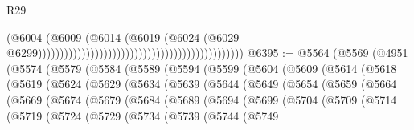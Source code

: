 \begin{lexlean}{R29}
\begin{coremodule}
                                                                                      (@6004
                                                                                        (@6009
                                                                                          (@6014
                                                                                            (@6019
                                                                                              (@6024
                                                                                                (@6029
                                                                                                  @6299)))))))))))))))))))))))))))))))))))))))))))))))
@6395 := @5564
    (@5569
      (@4951
        (@5574
          (@5579
            (@5584
              (@5589
                (@5594
                  (@5599
                    (@5604
                      (@5609
                        (@5614
                          (@5618
                            (@5619
                              (@5624
                                (@5629
                                  (@5634
                                    (@5639
                                      (@5644
                                        (@5649
                                          (@5654
                                            (@5659
                                              (@5664
                                                (@5669
                                                  (@5674
                                                    (@5679
                                                      (@5684
                                                        (@5689
                                                          (@5694
                                                            (@5699
                                                              (@5704
                                                                (@5709
                                                                  (@5714
                                                                    (@5719
                                                                      (@5724
                                                                        (@5729
                                                                          (@5734
                                                                            (@5739
                                                                              (@5744
                                                                                (@5749

\end{coremodule}
\end{lexlean}
